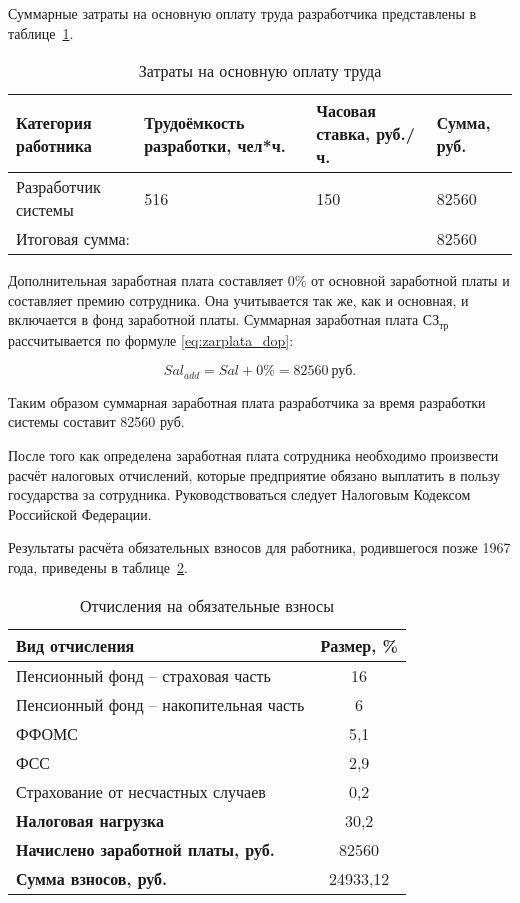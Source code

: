 Суммарные затраты на основную оплату труда разработчика представлены в таблице~\ref{tab:zarplata}.

\begin{myTable}
\begin{longtable}[h]{|p{}|p{}|p{}|p{}|}
	\caption{\label{tab:zarplata}Затраты на основную оплату труда} \\
	\hline
		\textbf{Категория работника} &
		\textbf{Трудоёмкость разработки, чел*ч.} &
		\textbf{Часовая ставка, руб./ч.} &
		\textbf{Сумма, руб.} \\
	\hline
		Разработчик системы & 516 & 150 & 82560 \\ \hline
		\multicolumn{3}{|l|}{Итоговая сумма:} & 82560 \\ \hline
\end{longtable}
\end{myTable}

Дополнительная заработная плата составляет 0\% от основной заработной платы и составляет премию сотрудника.
Она учитывается так же, как и основная, и включается в фонд заработной платы.
Суммарная заработная плата $СЗ_{тр}$ рассчитывается по формуле \ref{eq:zarplata_dop}: 

\begin{equation}
	\label{eq:zarplata_dop}
	Sal_{add} = Sal + 0\% = 82560~\text{руб}.
\end{equation}

Таким образом суммарная заработная плата разработчика за время разработки системы составит 82560 руб. 

После того как определена заработная плата сотрудника необходимо произвести расчёт налоговых отчислений, которые предприятие обязано выплатить в пользу государства за сотрудника.
Руководствоваться следует Налоговым Кодексом Российской Федерации.

Результаты расчёта обязательных взносов для работника, родившегося позже 1967 года, приведены в таблице~\ref{tab:zarplata_nalog}.

\begin{myTable}
\begin{table}[h!]
\caption{\label{tab:zarplata_nalog}Отчисления на обязательные взносы}
\begin{tabular}{|l|c|}
	\hline
	\textbf{Вид отчисления} & \textbf{Размер, \%} \\
	\hline 
	Пенсионный фонд -- страховая часть & 16 \\ 
	Пенсионный фонд -- накопительная часть & 6 \\
	ФФОМС & 5,1 \\ 
	ФСС & 2,9 \\ 
	Страхование от несчастных случаев & 0,2 \\
	\hline
	\textbf{Налоговая нагрузка} & 30,2 \\ \hline
	\textbf{Начислено заработной платы, руб.} & 82560 \\ \hline
	\textbf{Сумма взносов, руб.} & 24933,12 \\ \hline
\end{tabular}
\end{table}
\end{myTable}

